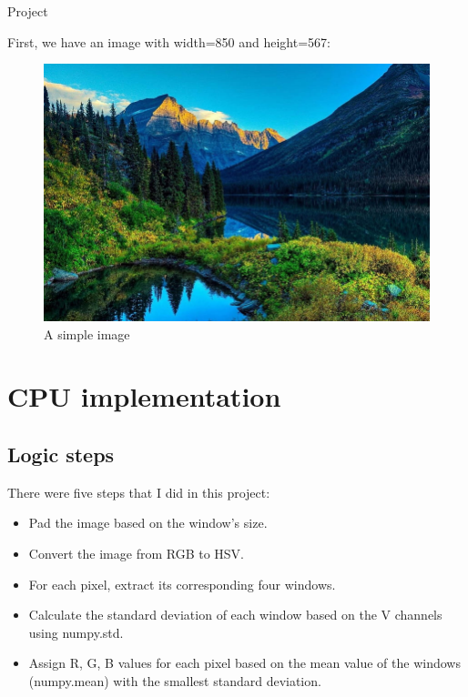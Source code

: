 \documentclass[12pt]{article}
\begin{document}
\begin{center}
    \vspace*{1.8cm}
    \Large
    Project\\
\end{center}

\noindent
First, we have an image with width=850 and height=567:
\begin{figure}[H]
\centering
    \includegraphics[height = 0.5\textheight, keepaspectratio]{images/scene.jpg}
    \caption{A simple image}
\end{figure}

\section{CPU implementation}

\subsection{Logic steps}
\noindent
There were five steps that I did in this project:

\begin{itemize}
    \item Pad the image based on the window's size.
    \item Convert the image from RGB to HSV.
    \item For each pixel, extract its corresponding four windows.
    \item Calculate the standard deviation of each window based on the V channels using numpy.std.
    \item Assign R, G, B values for each pixel based on the mean value of the windows (numpy.mean) with the smallest standard deviation.
\end{itemize}
\end{document}
